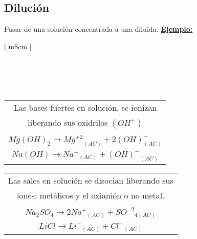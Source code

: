     \subsection{Dilución}
        \sangria{} Pasar de una solución concentrada a una diluida.
        \textbf{\underline{Ejemplo:}}
        \begin{center}
            \begin{tabular} {| m{8cm} |}
                \toprule
                 \\
                 \\ 
                 \\
                 \\
                 \\
                \bottomrule
            \end{tabular}

            \begin{tabular}{|m{8cm}|}
                \toprule
                \multicolumn{1}{|c|}{Las bases fuertes en solución, se ionizan} \\
                \multicolumn{1}{|c|}{liberando sus oxidrilos $(OH^+)$} \\
                \multicolumn{1}{|c|}{} \\
                \multicolumn{1}{|c|}{$Mg(OH)_2 \rightarrow {Mg^{+2}}_{(AC)} + 2(OH)^-_{(AC)}$} \\
                \multicolumn{1}{|c|}{$Na(OH) \rightarrow {Na^+}_{(AC)} + {(OH)^-}_{(AC)}$} \\
                \bottomrule
            \end{tabular}
        \end{center}
        \begin{center}
            \begin{tabular}{|m{8cm}|}
                \toprule
                \multicolumn{1}{|c|}{Las sales en solución se disocian liberando sus} \\
                \multicolumn{1}{|c|}{iones: metálicos y el oxianión o no metal.} \\
                \multicolumn{1}{|c|}{} \\
                \multicolumn{1}{|c|}{$Na_2SO_4 \rightarrow 2{Na^+}_{(AC)} + {SO^{-2}}_{4(AC)}$} \\
                \multicolumn{1}{|c|}{$LiCl \rightarrow {Li^+}_{(AC)} + {Cl^-}_{(AC)}$} \\
                \bottomrule
            \end{tabular}
        \end{center}

